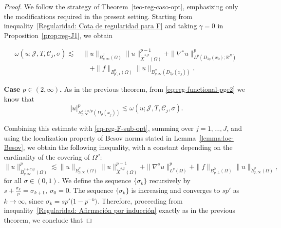 \documentclass[]{amsart}
\theoremstyle{definition}
\theoremstyle{definition}
\theoremstyle{remark}
\numberwithin{equation}{section}
\newcommand{\grads}{\nabla^{s}}
\begin{document}
	\begin{proof}
We follow the strategy of Theorem~\ref{teo-reg-caso-opt}, emphasizing only the modifications required in the present setting. 
Starting from inequality~\eqref{Regularidad: Cota de regularidad para F} and taking $\gamma = 0$ in Proposition~\ref{prop:reg-J1}, we obtain

\begin{equation}\label{eq-reg-F-sub-opt}
	\begin{aligned}
		\omega\left(u ; \mathcal{J}, T, \mathcal{C}_{j}, \sigma\right)
		\lesssim\;
		&\|u\|_{\dot{B}^{\sigma}_{p,\infty}(\Omega)}
		\|u\|^{p-1}_{\widetilde{X}^{s,p}(\Omega)}
		+\|\grads u\|^{p}_{L^{p}(D_{3\rho}(x_0); \mathbb{R}^N)} \\
		&\quad
		+\|f\|_{B_{p^{\prime}, 1}^{0}\left(\Omega\right)}
		\|u\|_{B_{p, \infty}^{\sigma}\left(D_{3 \rho}\left(x_{j}\right)\right)}.
	\end{aligned}
\end{equation}


\medskip
\noindent\textbf{Case $p \in (2,\infty)$.}
As in the previous theorem, from \eqref{eq:reg-functional-pge2} we know that
\[
|u|_{B_{p,\infty}^{s+\sigma/p}(D_\rho(x_j))}^p
\lesssim
\omega(u;\mathcal{J},T,\mathcal{C}_j,\sigma).
\]

Combining this estimate with \eqref{eq-reg-F-sub-opt}, summing over $j=1,\ldots,J$, and using the localization property of Besov norms stated in Lemma~\ref{lemma:loc-Besov}, we obtain the following inequality, with a constant depending on the cardinality of the covering of $\Omega^\rho$:
\begin{equation}
	\label{eq-bootstraping-subopt-p>2}
	\|u\|_{\dot{B}_{p, \infty}^{s+\sigma / p}\left(\Omega\right)}^p
	\lesssim
	\|u\|_{\dot{B}^{\sigma}_{p,\infty}(\Omega)}
	\|u\|^{p-1}_{\widetilde{X}^{s,p}(\Omega)}
	+\|\grads u\|^{p}_{L^{p}(\Omega)}
	+\|f\|_{B_{p^{\prime}, 1}^{0}\left(\Omega\right)}
	\|u\|_{\dot{B}_{p, \infty}^{\sigma}\left(\Omega\right)},
\end{equation}
for all $\sigma \in (0,1)$. 
We define the sequence $\{\sigma_k\}$ recursively by
$
	\label{eq-rec-p>2-s<1p'}
	s + \frac{\sigma_k}{p} = \sigma_{k+1},
	\ 
	\sigma_0 = 0. $
The sequence $\{\sigma_k\}$ is increasing and converges to $s p'$ as $k \to \infty$, since \(\sigma_k = s p'\bigl(1 - p^{-k}\bigr).\) Therefore, proceeding from inequality~\eqref{Regularidad: Afirmación por inducción} exactly as in the previous theorem, we conclude that


\end{proof}
\end{document}
